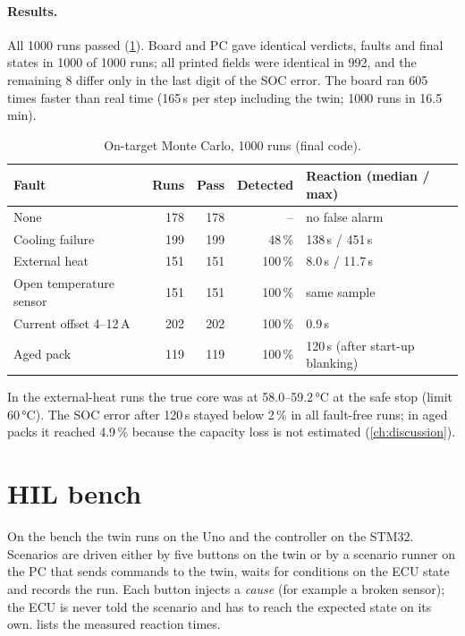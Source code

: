 \paragraph{Results.} All 1000 runs passed (\cref{tab:mc}). Board and PC gave identical verdicts, faults and final states in 1000 of 1000 runs; all printed fields were identical in 992, and the remaining 8 differ only in the last digit of the SOC error. The board ran 605 times faster than real time (165\,\textmu s per step including the twin; 1000 runs in 16.5\,min).

\begin{table}[htbp]\centering\small
\caption{On-target Monte Carlo, 1000 runs (final code).}\label{tab:mc}
\begin{tabular}{@{}lrrrl@{}}\toprule
Fault & Runs & Pass & Detected & Reaction (median / max) \\\midrule
None & 178 & 178 & -- & no false alarm \\
Cooling failure & 199 & 199 & 48\,\% & 138\,s / 451\,s \\
External heat & 151 & 151 & 100\,\% & 8.0\,s / 11.7\,s \\
Open temperature sensor & 151 & 151 & 100\,\% & same sample \\
Current offset 4--12\,A & 202 & 202 & 100\,\% & 0.9\,s \\
Aged pack & 119 & 119 & 100\,\% & 120\,s (after start-up blanking) \\\bottomrule
\end{tabular}
\end{table}

In the external-heat runs the true core was at 58.0--59.2\,°C at the safe stop (limit 60\,°C). The SOC error after 120\,s stayed below 2\,\% in all fault-free runs; in aged packs it reached 4.9\,\% because the capacity loss is not estimated (\cref{ch:discussion}).


\section{HIL bench}
On the bench the twin runs on the Uno and the controller on the STM32. Scenarios are driven either by five buttons on the twin or by a scenario runner on the PC that sends commands to the twin, waits for conditions on the ECU state and records the run. Each button injects a \emph{cause} (for example a broken sensor); the ECU is never told the scenario and has to reach the expected state on its own.  lists the measured reaction times.

